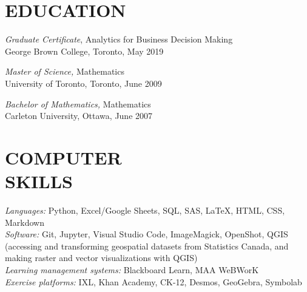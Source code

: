 \documentclass[margin, 10pt]{res} %
\begin{document}
\begin{resume}
\section{EDUCATION}

{\sl Graduate Certificate}, Analytics for Business Decision Making \\
George Brown College, Toronto, May 2019

{\sl Master of Science,} Mathematics \\
University of Toronto, Toronto, June 2009

{\sl Bachelor of Mathematics,} Mathematics \\
Carleton University, Ottawa, June 2007





\section{COMPUTER \\ SKILLS} 

{\sl Languages:} 
Python, Excel/Google Sheets, SQL, SAS, \LaTeX{}, HTML, CSS, Markdown \\

{\sl Software:}
Git, Jupyter, Visual Studio Code, ImageMagick, OpenShot, QGIS (accessing and transforming geospatial datasets from Statistics Canada, and making raster and vector visualizations with QGIS)\\

{\sl Learning management systems:}
Blackboard Learn, MAA WeBWorK \\

{\sl Exercise platforms:}
IXL, Khan Academy, CK-12, Desmos, GeoGebra, Symbolab

\end{resume}
\end{document}
